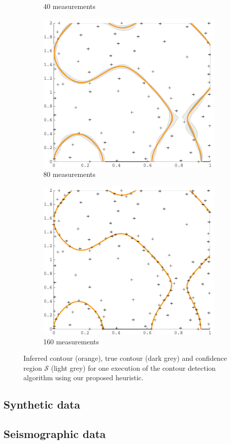\documentclass[11pt]{article} %
\begin{document}
\begin{figure}[tb]
\begin{subfigure}[b]{0.5\textwidth}
    \caption{40 measurements}
  \end{subfigure}
  \begin{subfigure}[b]{0.5\textwidth}
    \centering
    \includegraphics[width=\textwidth]{figures/sin2d_80}
    \caption{80 measurements}
  \end{subfigure}
  \begin{subfigure}[b]{0.5\textwidth}
    \centering
    \includegraphics[width=\textwidth]{figures/sin2d_160}
    \caption{160 measurements}
  \end{subfigure}
  \caption{Inferred contour (orange), true contour (dark grey) and confidence
           region $\mathcal{S}$ (light grey) for one execution of the
           contour detection algorithm using our proposed heuristic.}
  \label{fig:sin2d_steps}
\end{figure}

\subsection{Synthetic data}

\subsection{Seismographic data}



\end{document}
